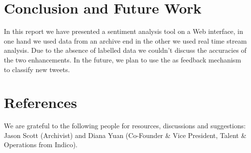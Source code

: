 \documentclass{acmtog} %
\begin{document}
\begin{table}[h!]

\label{tab:cross_tab}
\end{table}


\section{Conclusion and Future Work}
\label{sec:conclusion}

In this report we have presented a\cite{Lin18} sentiment analysis tool on a\cite{Medhat14} Web interface, in one hand we used data from an archive end in the other we used real time stream analysis. Due\cite{Rebecca11} to the absence of labelled data we couldn’t discuss the accuracies of the two enhancements. In the future\cite{Gautam14}, we plan to use the\cite{Badhani17} as feedback mechanism to classify new tweets.


\section{References}

\begin{acks}
We are grateful to the following people for resources, discussions and suggestions: Jason Scott (Archivist) and Diana Yuan (Co-Founder & Vice President, Talent & Operations from Indico).
\end{acks}





\end{document}

